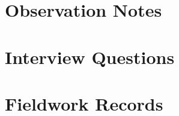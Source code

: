 \documentclass[12pt,a4paper]{report}
\begin{document}
\appendix

\chapter{Observation Notes}

\chapter{Interview Questions}

\chapter{Fieldwork Records}


\printindex

\end{document}
